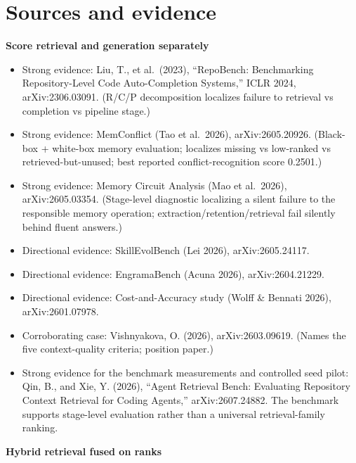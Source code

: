 \section*{Sources and evidence}

\textbf{Score retrieval and generation separately}

\begin{itemize}
\tightlist
\item
  Strong evidence: Liu, T., et al.~(2023), ``RepoBench: Benchmarking Repository-Level Code Auto-Completion Systems,'' ICLR 2024, arXiv:2306.03091. (R/C/P decomposition localizes failure to retrieval vs completion vs pipeline stage.)
\item
  Strong evidence: MemConflict (Tao et al.~2026), arXiv:2605.20926. (Black-box + white-box memory evaluation; localizes missing vs low-ranked vs retrieved-but-unused; best reported conflict-recognition score 0.2501.)
\item
  Strong evidence: Memory Circuit Analysis (Mao et al.~2026), arXiv:2605.03354. (Stage-level diagnostic localizing a silent failure to the responsible memory operation; extraction/retention/retrieval fail silently behind fluent answers.)
\item
  Directional evidence: SkillEvolBench (Lei 2026), arXiv:2605.24117.
\item
  Directional evidence: EngramaBench (Acuna 2026), arXiv:2604.21229.
\item
  Directional evidence: Cost-and-Accuracy study (Wolff \& Bennati 2026), arXiv:2601.07978.
\item
  Corroborating case: Vishnyakova, O. (2026), arXiv:2603.09619. (Names the five context-quality criteria; position paper.)
\item
  Strong evidence for the benchmark measurements and controlled seed pilot: Qin, B., and Xie, Y. (2026), ``Agent Retrieval Bench: Evaluating Repository Context Retrieval for Coding Agents,'' arXiv:2607.24882. The benchmark supports stage-level evaluation rather than a universal retrieval-family ranking.
\end{itemize}

\textbf{Hybrid retrieval fused on ranks}

